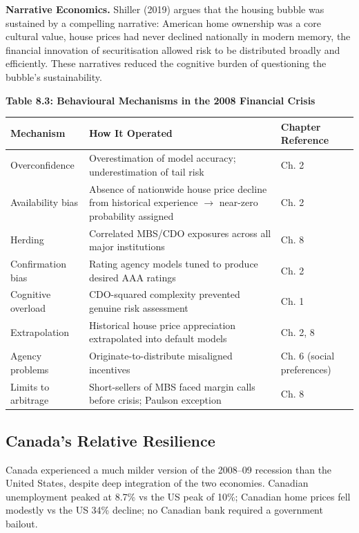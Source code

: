 \documentclass[12pt, letterpaper]{article}
\begin{document}
\textbf{Narrative Economics.} Shiller (2019) argues that the housing bubble was sustained by a compelling narrative: American home ownership was a core cultural value, house prices had never declined nationally in modern memory, the financial innovation of securitisation allowed risk to be distributed broadly and efficiently. These narratives reduced the cognitive burden of questioning the bubble's sustainability.

\textbf{Table 8.3: Behavioural Mechanisms in the 2008 Financial Crisis}


\begin{table}[H]
\centering
\small
\begin{tabularx}{\linewidth}{lYY}
\toprule
Mechanism & How It Operated & Chapter Reference \\
\midrule
Overconfidence & Overestimation of model accuracy; underestimation of tail risk & Ch. 2 \\
Availability bias & Absence of nationwide house price decline from historical experience $\rightarrow$ near-zero probability assigned & Ch. 2 \\
Herding & Correlated MBS/CDO exposures across all major institutions & Ch. 8 \\
Confirmation bias & Rating agency models tuned to produce desired AAA ratings & Ch. 2 \\
Cognitive overload & CDO-squared complexity prevented genuine risk assessment & Ch. 1 \\
Extrapolation & Historical house price appreciation extrapolated into default models & Ch. 2, 8 \\
Agency problems & Originate-to-distribute misaligned incentives & Ch. 6 (social preferences) \\
Limits to arbitrage & Short-sellers of MBS faced margin calls before crisis; Paulson exception & Ch. 8 \\
\bottomrule
\end{tabularx}
\end{table}



\subsection{Canada's Relative Resilience}


Canada experienced a much milder version of the 2008--09 recession than the United States, despite deep integration of the two economies. Canadian unemployment peaked at 8.7\% vs the US peak of 10\%; Canadian home prices fell modestly vs the US 34\% decline; no Canadian bank required a government bailout.
\end{document}
